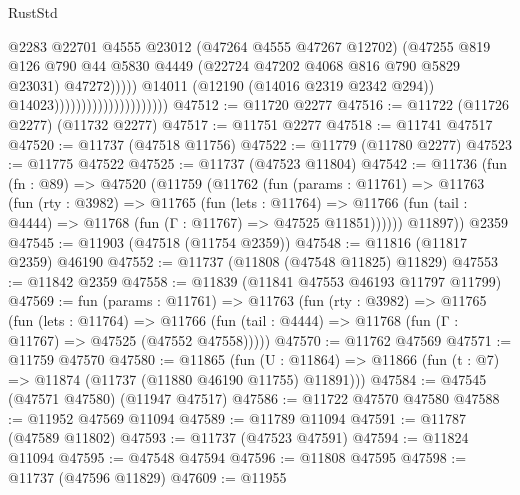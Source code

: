 \begin{lexlean}{RustStd}
\begin{coremodule}
                                                      @2283
                                                      @22701
                                                      @4555
                                                      @23012
                                                      (@47264 @4555 @47267 @12702)
                                                      (@47255
                                                        @819
                                                        @126
                                                        @790
                                                        @44
                                                        @5830
                                                        @4449
                                                        (@22724 @47202 @4068 @816 @790 @5829 @23031)
                                                        @47272)))))
                                              @14011
                                              (@12190 (@14016 @2319 @2342 @294))
                                              @14023)))))))))))))))))))))
@47512 := @11720 @2277
@47516 := @11722 (@11726 @2277) (@11732 @2277)
@47517 := @11751 @2277
@47518 := @11741 @47517
@47520 := @11737 (@47518 @11756)
@47522 := @11779 (@11780 @2277)
@47523 := @11775 @47522
@47525 := @11737 (@47523 @11804)
@47542 := @11736
    (fun (fn : @89) =>
    @47520
      (@11759
        (@11762
          (fun (params : @11761) =>
          @11763
            (fun (rty : @3982) =>
            @11765
              (fun (lets : @11764) =>
              @11766 (fun (tail : @4444) => @11768 (fun (Γ : @11767) => @47525 @11851))))))
        @11897))
    @2359
@47545 := @11903 (@47518 (@11754 @2359))
@47548 := @11816 (@11817 @2359) @46190
@47552 := @11737 (@11808 (@47548 @11825) @11829)
@47553 := @11842 @2359
@47558 := @11839 (@11841 @47553 @46193 @11797 @11799)
@47569 := fun (params : @11761) =>
  @11763
    (fun (rty : @3982) =>
    @11765
      (fun (lets : @11764) =>
      @11766 (fun (tail : @4444) => @11768 (fun (Γ : @11767) => @47525 (@47552 @47558)))))
@47570 := @11762 @47569
@47571 := @11759 @47570
@47580 := @11865
    (fun (U : @11864) => @11866 (fun (t : @7) => @11874 (@11737 (@11880 @46190 @11755) @11891)))
@47584 := @47545 (@47571 @47580) (@11947 @47517)
@47586 := @11722 @47570 @47580
@47588 := @11952 @47569 @11094
@47589 := @11789 @11094
@47591 := @11787 (@47589 @11802)
@47593 := @11737 (@47523 @47591)
@47594 := @11824 @11094
@47595 := @47548 @47594
@47596 := @11808 @47595
@47598 := @11737 (@47596 @11829)
@47609 := @11955

\end{coremodule}
\end{lexlean}
